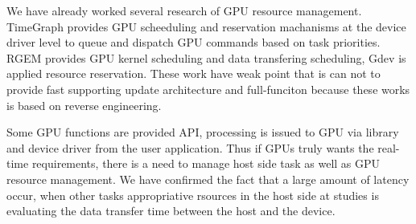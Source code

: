 We have already worked several research of GPU resource management.
TimeGraph\cite{kato:timegraph} provides GPU scheeduling and reservation machanisms at the device driver level to queue and dispatch GPU commands based on task priorities.
RGEM\cite{kato:rgem} provides GPU kernel scheduling and data transfering scheduling, Gdev\cite{kato:gdev} is applied resource reservation.
These work have weak point that is can not to provide fast supporting update architecture and full-funciton because these works is based on reverse engineering.

Some GPU functions are provided API, processing is issued to GPU via library and device driver from the user application.
Thus if GPUs truly wants the real-time requirements,  there is a need to manage host side task as well as GPU resource management.
We have confirmed the fact that a large amount of latency occur,
when other tasks appropriative rsources in the host side at studies\cite{fujii:icpads2013} is evaluating the data transfer time between the host and the device.

